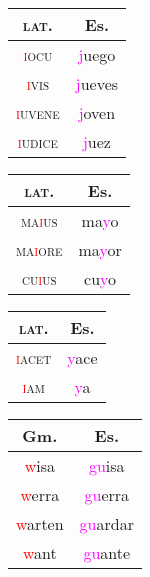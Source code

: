 \documentclass{report}
\begin{document}
\begin{tcolorbox}[title=Nasal Nasal Cluster from Syncope]
  
\end{tcolorbox}

\begin{tcolorbox}[title=Betacism I]

\end{tcolorbox}

\begin{tcolorbox}[title=Initial Yod Fortition]

\end{tcolorbox}

\begin{tabular}{c c}
  \textsc{lat.} & Es. \\
  \hline
  \textsc{\textcolor{red}{i}ocu} & \textcolor{magenta}{j}uego \quad [x] \\
  \textsc{\textcolor{red}{i}vis} & \textcolor{magenta}{j}ueves \quad [x] \\
  \textsc{\textcolor{red}{i}uvene} & \textcolor{magenta}{j}oven \quad [x] \\
  \textsc{\textcolor{red}{i}udice} & \textcolor{magenta}{j}uez \quad [x] \\
\end{tabular}

\begin{tabular}{c c}
  \textsc{lat.} & Es. \\
  \hline
  \textsc{ma\textcolor{red}{i}us} & ma\textcolor{magenta}{y}o \\
  \textsc{ma\textcolor{red}{i}ore} & ma\textcolor{magenta}{y}or \\
  \textsc{cu\textcolor{red}{i}us} & cu\textcolor{magenta}{y}o \\
\end{tabular}

\begin{tabular}{c c}
  \textsc{lat.} & Es. \\
  \hline
  \textsc{\textcolor{red}{i}acet} & \textcolor{magenta}{y}ace \\
  \textsc{\textcolor{red}{i}am} & \textcolor{magenta}{y}a \\
\end{tabular}

\begin{tcolorbox}[title=Fortition of /w/ in Germanic Loanwords]
  
\end{tcolorbox}

\begin{tabular}{c c}
  Gm. & Es. \\  
  \hline
  \textcolor{red}{w}isa & \textcolor{magenta}{gu}isa \\
  \textcolor{red}{w}erra & \textcolor{magenta}{gu}erra \\
  \textcolor{red}{w}arten & \textcolor{magenta}{gu}ardar \\
  \textcolor{red}{w}ant & \textcolor{magenta}{gu}ante \\
\end{tabular}
\end{document}
